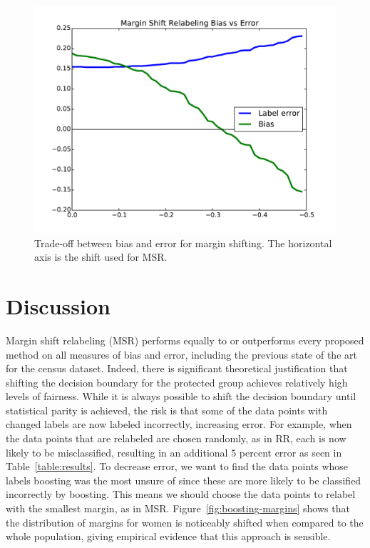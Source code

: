 \documentclass{article}
\begin{document}
\begin{figure}[t]
\centering
\includegraphics[width=\columnwidth]{images/relabeling-msr-tradeoffs.pdf}
\caption{Trade-off between bias and error for margin shifting. The horizontal axis is the shift used for MSR.}
\label{fig:tradeoffs}
\end{figure}

\section{Discussion}\label{sec:discussion}

Margin shift relabeling (MSR) performs equally to or outperforms every proposed
method on all measures of bias and error, including the previous state of the
art for the census dataset. Indeed, there is significant theoretical justification
that shifting the decision boundary for the protected group achieves relatively high levels of
fairness.  While it is always possible to shift the decision boundary until statistical parity is achieved, the risk is that some of the data points with changed labels are now labeled incorrectly, increasing error.  For example, when the data points that are relabeled are chosen randomly, as in RR, each is now likely to be misclassified, resulting in an additional $5$ percent error as seen in Table~\ref{table:results}.  To decrease error, we want to find the data points whose labels boosting was the most unsure of since 
these are more likely to be classified incorrectly by boosting.
This means we should choose the data points to relabel with the smallest margin, as in MSR.
Figure~\ref{fig:boosting-margins} shows that the
distribution of margins for women is noticeably shifted when compared to the
whole population, giving empirical evidence that this approach is sensible.
\end{document}
